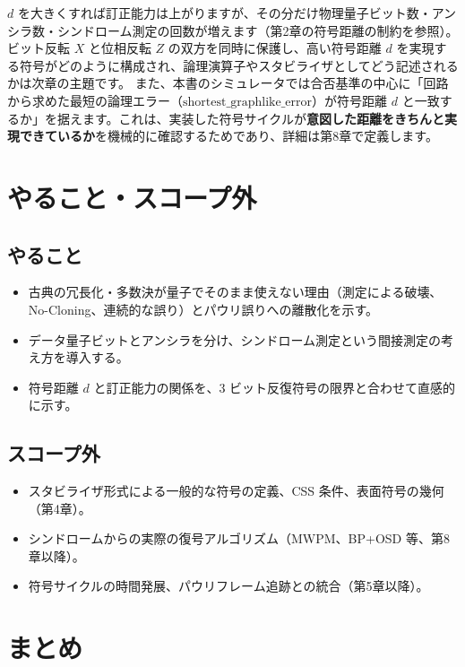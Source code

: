 $d$ を大きくすれば訂正能力は上がりますが、その分だけ物理量子ビット数・アンシラ数・シンドローム測定の回数が増えます（第2章の符号距離の制約を参照）。
ビット反転 $X$ と位相反転 $Z$ の双方を同時に保護し、高い符号距離 $d$ を実現する符号がどのように構成され、論理演算子やスタビライザとしてどう記述されるかは次章の主題です。
また、本書のシミュレータでは合否基準の中心に「回路から求めた最短の論理エラー（$\mathrm{shortest\_graphlike\_error}$）が符号距離 $d$ と一致するか」を据えます。これは、実装した符号サイクルが\textbf{意図した距離をきちんと実現できているか}を機械的に確認するためであり、詳細は第8章で定義します。

\section{やること・スコープ外}\label{sec:qec_intro_scope}

\subsection{やること}

\begin{itemize}
  \item 古典の冗長化・多数決が量子でそのまま使えない理由（測定による破壊、No-Cloning、連続的な誤り）とパウリ誤りへの離散化を示す。
  \item データ量子ビットとアンシラを分け、シンドローム測定という間接測定の考え方を導入する。
  \item 符号距離 $d$ と訂正能力の関係を、3 ビット反復符号の限界と合わせて直感的に示す。
\end{itemize}

\subsection{スコープ外}

\begin{itemize}
  \item スタビライザ形式による一般的な符号の定義、CSS 条件、表面符号の幾何（第4章）。
  \item シンドロームからの実際の復号アルゴリズム（MWPM、BP+OSD 等、第8章以降）。
  \item 符号サイクルの時間発展、パウリフレーム追跡との統合（第5章以降）。
\end{itemize}

\section{まとめ}\label{ch3:summary}

